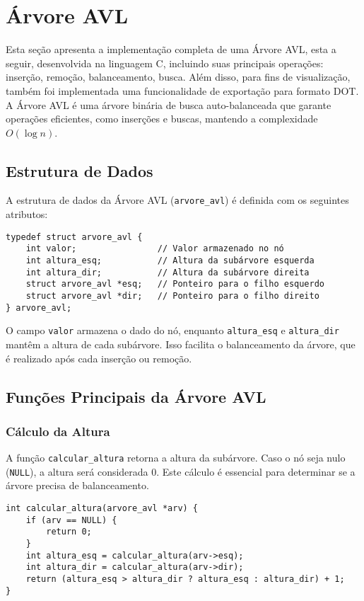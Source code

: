 \section{Árvore AVL}

Esta seção apresenta a implementação completa de uma Árvore AVL, esta a seguir, desenvolvida na linguagem C,
incluindo suas principais operações: inserção, remoção, balanceamento, busca. 
Além disso, para fins de visualização, também foi implementada uma funcionalidade de exportação para formato DOT.
A Árvore AVL é uma árvore binária de busca auto-balanceada que garante operações eficientes, como inserções e buscas, mantendo a complexidade \(O(\log n)\).

\subsection{Estrutura de Dados}

A estrutura de dados da Árvore AVL (\texttt{arvore\_avl}) é definida com os seguintes atributos:

\begin{verbatim}
typedef struct arvore_avl {
    int valor;                // Valor armazenado no nó
    int altura_esq;           // Altura da subárvore esquerda
    int altura_dir;           // Altura da subárvore direita
    struct arvore_avl *esq;   // Ponteiro para o filho esquerdo
    struct arvore_avl *dir;   // Ponteiro para o filho direito
} arvore_avl;
\end{verbatim}

O campo \texttt{valor} armazena o dado do nó, enquanto \texttt{altura\_esq} e \texttt{altura\_dir} mantêm a altura de cada subárvore. 
Isso facilita o balanceamento da árvore, que é realizado após cada inserção ou remoção.

\subsection{Funções Principais da Árvore AVL}

\subsubsection{Cálculo da Altura}

A função \texttt{calcular\_altura} retorna a altura da subárvore. Caso o nó seja nulo (\texttt{NULL}), a altura será considerada 0. 
Este cálculo é essencial para determinar se a árvore precisa de balanceamento.

\begin{verbatim}
int calcular_altura(arvore_avl *arv) {
    if (arv == NULL) {
        return 0;
    }
    int altura_esq = calcular_altura(arv->esq);
    int altura_dir = calcular_altura(arv->dir);
    return (altura_esq > altura_dir ? altura_esq : altura_dir) + 1;
}
\end{verbatim}

